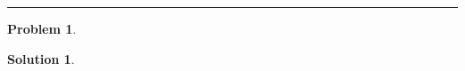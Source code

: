 \documentclass[a4paper, 10pt]{article}
\theoremstyle{definition}
\newtheorem{problem}{Problem}
\theoremstyle{hSol}
\newtheorem*{solution}{Solution}
\begin{document}
\noindent\rule{16cm}{0.4pt}
\begin{problem} 
\end{problem}
\begin{solution}
\end{solution}
\end{document}
